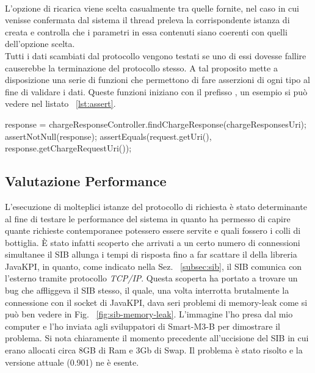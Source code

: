 \begin{java}[caption={Handler associato al messaggio di risposta},label={lst:response-handler}]
String subscriptionID = xmlTools.getSubscriptionID(xml);
if (chargeResponseSubId.equals(subscriptionID)) {
		[...]
		chargeResponsesUri = subscriptionResult.get(0);
		synchronized (chargeResponseLock) {
			chargeResponseLock.notify();
		}
	}
}
\end{java}
\\
\noindent
L'opzione di ricarica viene scelta casualmente tra quelle fornite, nel caso in cui venisse confermata dal sistema il thread preleva la corrispondente istanza di  creata e controlla che i parametri in essa contenuti siano coerenti con quelli dell'opzione scelta.\\
Tutti i dati scambiati dal protocollo vengono testati se uno di essi dovesse fallire causerebbe la terminazione del protocollo stesso. A tal proposito  mette a disposizione una serie di funzioni che permettono di fare asserzioni di ogni tipo al fine di validare i dati. Queste funzioni iniziano con il prefisso , un esempio si può vedere nel listato ~\ref{lst:assert}.

\begin{java}[caption={Risposta ricavata a partire dall'uri, test del risultato},label={lst:assert}]
response = chargeResponseController.findChargeResponse(chargeResponsesUri);
assertNotNull(response);
assertEquals(request.getUri(), response.getChargeRequestUri());
\end{java}

\subsection{Valutazione Performance}

L'esecuzione di molteplici istanze del protocollo di richiesta è stato determinante al fine di testare le performance del sistema in quanto ha permesso di capire quante richieste contemporanee potessero essere servite e quali fossero i colli di bottiglia. È stato infatti scoperto che arrivati a un certo numero di connessioni simultanee il SIB allunga i tempi di risposta fino a far scattare il  della libreria JavaKPI, in quanto, come indicato nella Sez. ~\ref{subsec:sib}, il SIB comunica con l'esterno tramite protocollo \emph{TCP/IP}. Questa scoperta ha portato a trovare un bug che affliggeva il SIB stesso, il quale, una volta interrotta brutalmente la connessione con il socket di JavaKPI, dava seri problemi di memory-leak come si può ben vedere in Fig. ~\ref{fig:sib-memory-leak}. L'immagine l'ho presa dal mio computer e l'ho inviata agli sviluppatori di Smart-M3-B per dimostrare il problema. Si nota chiaramente il momento precedente all'uccisione del SIB in cui erano allocati circa 8GB di Ram e 3Gb di Swap. Il problema è stato risolto e la versione attuale (0.901) ne è esente.

